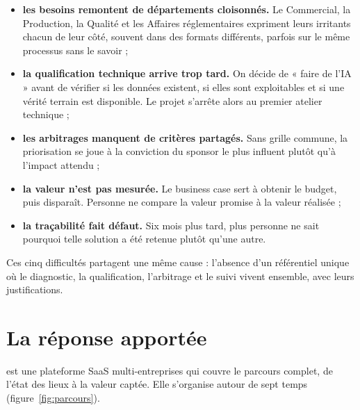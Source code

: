 \begin{itemize}
  \item \textbf{les besoins remontent de départements cloisonnés.} Le Commercial, la
    Production, la Qualité et les Affaires réglementaires expriment leurs irritants
    chacun de leur côté, souvent dans des formats différents, parfois sur le même
    processus sans le savoir ;
  \item \textbf{la qualification technique arrive trop tard.} On décide de « faire de
    l'IA » avant de vérifier si les données existent, si elles sont exploitables et si
    une vérité terrain est disponible. Le projet s'arrête alors au premier atelier
    technique ;
  \item \textbf{les arbitrages manquent de critères partagés.} Sans grille commune,
    la priorisation se joue à la conviction du sponsor le plus influent plutôt qu'à
    l'impact attendu ;
  \item \textbf{la valeur n'est pas mesurée.} Le business case sert à obtenir le budget,
    puis disparaît. Personne ne compare la valeur promise à la valeur réalisée ;
  \item \textbf{la traçabilité fait défaut.} Six mois plus tard, plus personne ne sait
    pourquoi telle solution a été retenue plutôt qu'une autre.
\end{itemize}

Ces cinq difficultés partagent une même cause : l'absence d'un référentiel unique où
le diagnostic, la qualification, l'arbitrage et le suivi vivent ensemble, avec leurs
justifications.

\section*{La réponse apportée}

\appname{} est une plateforme SaaS multi-entreprises qui couvre le parcours complet,
de l'état des lieux à la valeur captée. Elle s'organise autour de sept temps
(figure~\ref{fig:parcours}).

